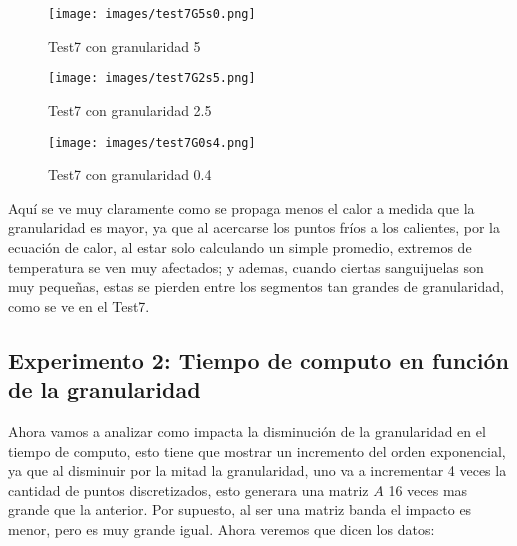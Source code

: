 \documentclass[a4paper]{article}
\begin{document}
\begin{figure}[H]
  \captionsetup{labelformat=empty}
  \begin{center}
    \texttt{[image: images/test7G5s0.png]}
    \caption{Test7 con granularidad 5}
    \label{fig:exp1-5}
  \end{center}
  \endminipage\hfill
  \begin{center}
    \texttt{[image: images/test7G2s5.png]}
    \caption{Test7 con granularidad 2.5}
    \label{fig:exp1-2}
  \end{center}
  \endminipage\hfill
  \begin{center}
    \texttt{[image: images/test7G0s4.png]}
    \caption{Test7 con granularidad 0.4}
    \label{fig:exp1-2}
  \end{center}
  \endminipage\hfill
\end{figure}
Aquí se ve muy claramente como se propaga menos el calor a medida que la granularidad es mayor, ya que al acercarse los puntos fríos a los calientes, por la ecuación de calor, al estar solo calculando un simple promedio, extremos de temperatura se ven muy afectados; y ademas, cuando ciertas sanguijuelas son muy pequeñas, estas se pierden entre los segmentos tan grandes de granularidad, como se ve en el Test7.

\subsection{Experimento 2: Tiempo de computo en función de la granularidad}
Ahora vamos a analizar como impacta la disminución de la granularidad en el tiempo de computo, esto tiene que mostrar un incremento del orden exponencial, ya que al disminuir por la mitad la granularidad, uno va a incrementar 4 veces la cantidad de puntos discretizados, esto generara una matriz $A$ 16 veces mas grande que la anterior. Por supuesto, al ser una matriz banda el impacto es menor, pero es muy grande igual. Ahora veremos que dicen los datos:
\end{document}
